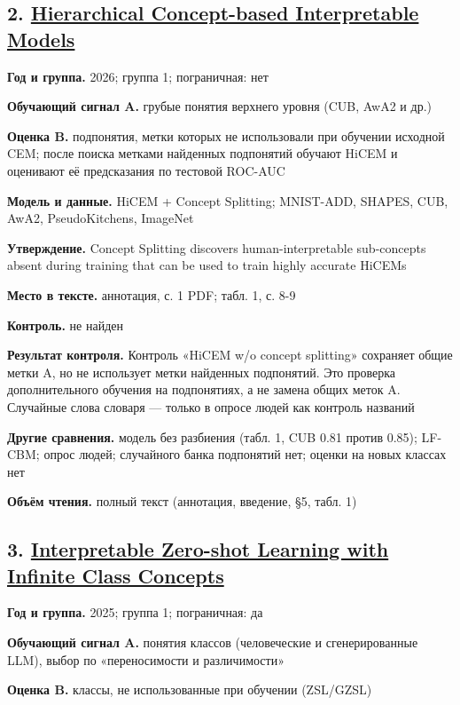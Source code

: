 \subsection*{2. \href{https://doi.org/10.48550/arxiv.2602.23947}{Hierarchical Concept-based Interpretable Models}}

\textbf{Год и группа.} 2026; группа 1; пограничная: нет

\textbf{Обучающий сигнал A.} грубые понятия верхнего уровня (CUB, AwA2 и др.)

\textbf{Оценка B.} подпонятия, метки которых не использовали при обучении исходной CEM; после поиска метками найденных подпонятий обучают HiCEM и оценивают её предсказания по тестовой ROC-AUC

\textbf{Модель и данные.} HiCEM + Concept Splitting; MNIST-ADD, SHAPES, CUB, AwA2, PseudoKitchens, ImageNet

\textbf{Утверждение.} Concept Splitting discovers human-interpretable sub-concepts absent during training that can be used to train highly accurate HiCEMs

\textbf{Место в тексте.} аннотация, с. 1 PDF; табл. 1, с. 8-9

\textbf{Контроль.} не найден

\textbf{Результат контроля.} Контроль «HiCEM w/o concept splitting» сохраняет общие метки A, но не использует метки найденных подпонятий. Это проверка дополнительного обучения на подпонятиях, а не замена общих меток A. Случайные слова словаря — только в опросе людей как контроль названий

\textbf{Другие сравнения.} модель без разбиения (табл. 1, CUB 0.81 против 0.85); LF-CBM; опрос людей; случайного банка подпонятий нет; оценки на новых классах нет

\textbf{Объём чтения.} полный текст (аннотация, введение, §5, табл. 1)


\subsection*{3. \href{https://doi.org/10.48550/arxiv.2505.03361}{Interpretable Zero-shot Learning with Infinite Class Concepts}}

\textbf{Год и группа.} 2025; группа 1; пограничная: да

\textbf{Обучающий сигнал A.} понятия классов (человеческие и сгенерированные LLM), выбор по «переносимости и различимости»

\textbf{Оценка B.} классы, не использованные при обучении (ZSL/GZSL)

